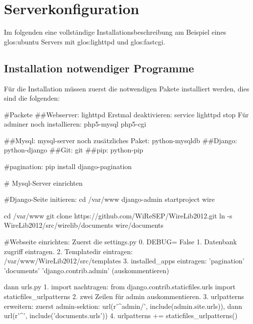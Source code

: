 \chapter{Serverkonfiguration}
Im folgenden eine vollständige Installationsbeschreibung am Beispiel eines
\Gls{glos:ubuntu} Servers mit \Gls{glos:lighttpd} und \Gls{glos:fastcgi}.

\section{Installation notwendiger Programme}
Für die Installation müssen zuerst die notwendigen Pakete installiert werden,
dies sind die folgenden:

#Packete
##Webserver: lighttpd
Erstmal deaktivieren: service lighttpd stop
Für adminer noch installieren: php5-mysql php5-cgi

##Mysql: mysql-server
noch zusätzliches Paket: python-mysqldb
##Django: python-django
##Git: git
##pip: python-pip

#pagination: pip install django-pagination 

# Mysql-Server einrichten

#Django-Seite initieren:
  cd /var/www
  django-admin startproject wire

  cd /var/www
  git clone https://github.com/WiReSEP/WireLib2012.git
  ln -s WireLib2012/src/wirelib/documents wire/documents

#Webseite einrichten:
Zuerst die settings.py
 0. DEBUG= False
 1. Datenbank zugriff eintragen.
 2. Templatedir eintragen: /var/www/WireLib2012/src/templates
 3. installed_apps eintragen: 
  'pagination'
  'documents'
  'django.contrib.admin' (auskommentieren)

dann urls.py
 1. import nachtragen: 
 from django.contrib.staticfiles.urls import staticfiles_urlpatterns
 2. zwei Zeilen für admin auskommentieren.
 3. urlpatterns erweitern:
 zuerst admin-sektion: url(r'^admin/', include(admin.site.urls)),
 dann url(r'^', include('documents.urls'))
 4. urlpatterns += staticfiles_urlpatterns()
